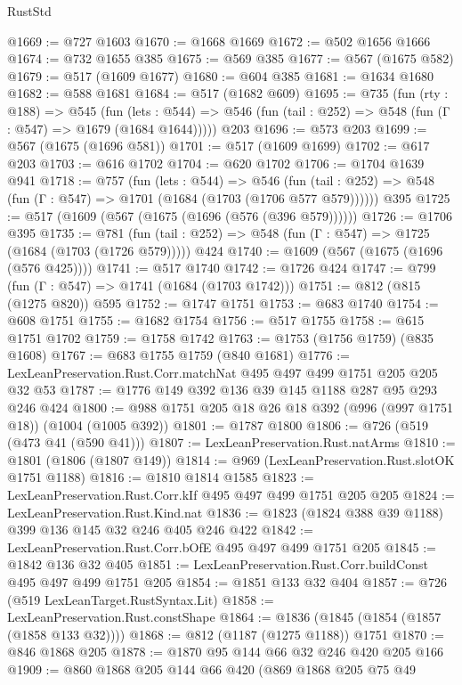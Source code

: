\begin{lexlean}{RustStd}
\begin{coremodule}
@1669 := @727 @1603
@1670 := @1668 @1669
@1672 := @502 @1656 @1666
@1674 := @732 @1655 @385
@1675 := @569 @385
@1677 := @567 (@1675 @582)
@1679 := @517 (@1609 @1677)
@1680 := @604 @385
@1681 := @1634 @1680
@1682 := @588 @1681
@1684 := @517 (@1682 @609)
@1695 := @735
    (fun (rty : @188) =>
    @545
      (fun (lets : @544) =>
      @546 (fun (tail : @252) => @548 (fun (Γ : @547) => @1679 (@1684 @1644)))))
    @203
@1696 := @573 @203
@1699 := @567 (@1675 (@1696 @581))
@1701 := @517 (@1609 @1699)
@1702 := @617 @203
@1703 := @616 @1702
@1704 := @620 @1702
@1706 := @1704 @1639 @941
@1718 := @757
    (fun (lets : @544) =>
    @546 (fun (tail : @252) => @548 (fun (Γ : @547) => @1701 (@1684 (@1703 (@1706 @577 @579))))))
    @395
@1725 := @517 (@1609 (@567 (@1675 (@1696 (@576 (@396 @579))))))
@1726 := @1706 @395
@1735 := @781
    (fun (tail : @252) => @548 (fun (Γ : @547) => @1725 (@1684 (@1703 (@1726 @579)))))
    @424
@1740 := @1609 (@567 (@1675 (@1696 (@576 @425))))
@1741 := @517 @1740
@1742 := @1726 @424
@1747 := @799 (fun (Γ : @547) => @1741 (@1684 (@1703 @1742)))
@1751 := @812 (@815 (@1275 @820)) @595
@1752 := @1747 @1751
@1753 := @683 @1740
@1754 := @608 @1751
@1755 := @1682 @1754
@1756 := @517 @1755
@1758 := @615 @1751 @1702
@1759 := @1758 @1742
@1763 := @1753 (@1756 @1759) (@835 @1608)
@1767 := @683 @1755 @1759 (@840 @1681)
@1776 := LexLeanPreservation.Rust.Corr.matchNat @495 @497 @499 @1751 @205 @205 @32 @53
@1787 := @1776 @149 @392 @136 @39 @145 @1188 @287 @95 @293 @246 @424
@1800 := @988 @1751 @205 @18 @26 @18 @392 (@996 (@997 @1751 @18)) (@1004 (@1005 @392))
@1801 := @1787 @1800
@1806 := @726 (@519 (@473 @41 (@590 @41)))
@1807 := LexLeanPreservation.Rust.natArms
@1810 := @1801 (@1806 (@1807 @149))
@1814 := @969 (LexLeanPreservation.Rust.slotOK @1751 @1188)
@1816 := @1810 @1814 @1585
@1823 := LexLeanPreservation.Rust.Corr.kIf @495 @497 @499 @1751 @205 @205
@1824 := LexLeanPreservation.Rust.Kind.nat
@1836 := @1823 (@1824 @388 @39 @1188) @399 @136 @145 @32 @246 @405 @246 @422
@1842 := LexLeanPreservation.Rust.Corr.bOfE @495 @497 @499 @1751 @205
@1845 := @1842 @136 @32 @405
@1851 := LexLeanPreservation.Rust.Corr.buildConst @495 @497 @499 @1751 @205
@1854 := @1851 @133 @32 @404
@1857 := @726 (@519 LexLeanTarget.RustSyntax.Lit)
@1858 := LexLeanPreservation.Rust.constShape
@1864 := @1836 (@1845 (@1854 (@1857 (@1858 @133 @32))))
@1868 := @812 (@1187 (@1275 @1188)) @1751
@1870 := @846 @1868 @205
@1878 := @1870 @95 @144 @66 @32 @246 @420 @205 @166
@1909 := @860
    @1868
    @205
    @144
    @66
    @420
    (@869
      @1868
      @205
      @75
      @49

\end{coremodule}
\end{lexlean}
